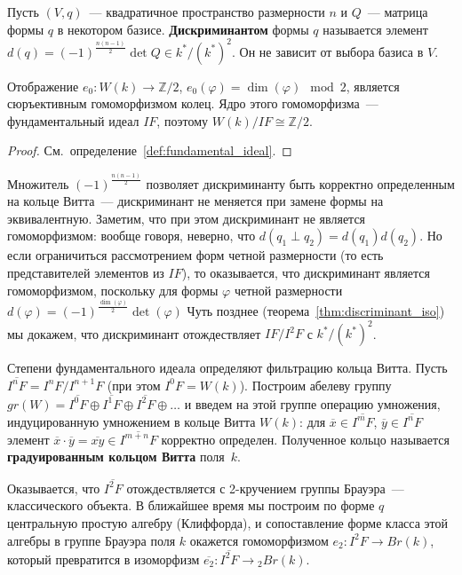 \documentclass[a4paper,oneside,12pt]{article}
\theoremstyle{plain} { \swapnumbers
\newtheorem{theorem}{Теорема}[subsection]
\newtheorem{corollary}[theorem]{Следствие}
\newtheorem{lemma}[theorem]{Лемма}
\newtheorem{proposition}[theorem]{Утверждение}
\newtheorem{claim}[theorem]{Факт}
}
\theoremstyle{definition} { \swapnumbers
\newtheorem{definition}[theorem]{Определение}
\newtheorem{notation}[theorem]{Обозначение}
\newtheorem{remark}[theorem]{Замечание}
\newtheorem{remarks}[theorem]{Замечания}
\newtheorem{example}[theorem]{Пример}
\newtheorem{examples}[theorem]{Примеры}
\newtheorem{sssection}[theorem]{}
}
\def\ph{\varphi}
\begin{document}
\begin{definition}
Пусть $(V,q)$~--- квадратичное пространство размерности $n$ и $Q$~--- матрица формы $q$ в некотором базисе.
{\bf Дискриминантом} формы $q$ называется элемент $d(q)=(-1)^{\frac{n(n-1)}{2}}\det Q\in k^*/(k^*)^2$.
Он не зависит от выбора базиса в $V$.
\end{definition}

\begin{proposition}
Отображение $e_0\colon W(k)\to\mathbb Z/2$, $e_0(\ph)=\dim(\ph)\mod 2$, является сюръективным
гомоморфизмом колец. Ядро этого гомоморфизма~--- фундаментальный идеал $IF$, поэтому
$W(k)/IF\cong\mathbb Z/2$.
\end{proposition}
\begin{proof}
См.~определение~\ref{def:fundamental_ideal}.
\end{proof}

Множитель $(-1)^{\frac{n(n-1)}{2}}$ позволяет дискриминанту быть корректно определенным на
кольце Витта~--- дискриминант не меняется при замене формы на эквивалентную.
Заметим, что при этом дискриминант не является гомоморфизмом: вообще говоря, неверно, что
$d(q_1\perp q_2)=d(q_1)d(q_2)$. Но если ограничиться рассмотрением форм четной размерности
(то есть представителей элементов из $IF$), то оказывается, что дискриминант является
гомоморфизмом,
поскольку для формы $\ph$ четной размерности $d(\ph)=(-1)^{\frac{\dim(\ph)}{2}}\det(\ph)$
Чуть позднее (теорема~\ref{thm:discriminant_iso})
мы докажем, что дискриминант отождествляет $IF/I^2F$ с $k^*/(k^*)^2$.

\begin{definition}
Степени фундаментального идеала определяют фильтрацию кольца Витта.
Пусть $\overline{I^nF}=I^nF/I^{n+1}F$ (при этом $I^0F=W(k)$). Построим
абелеву группу $gr(W)=\overline{I^0F}\oplus\overline{I^1F}\oplus\overline{I^2F}\oplus\dots$
и введем на этой группе операцию умножения, индуцированную умножением в кольце Витта $W(k)$:
для $\overline{x}\in\overline{I^mF}$, $\overline{y}\in\overline{I^nF}$ элемент
$\overline{x}\cdot\overline{y}=\overline{xy}\in\overline{I^{m+n}F}$ корректно определен.
Полученное кольцо называется {\bf градуированным кольцом Витта} поля~$k$.
\end{definition}

Оказывается, что $\overline{I^2F}$ отождествляется с 2-кручением группы
Брауэра~--- классического объекта. В ближайшее время мы построим по форме $q$ центральную простую алгебру
(Клиффорда), и сопоставление форме класса этой алгебры в группе Брауэра поля $k$
окажется гомоморфизмом $e_2\colon I^2F\to Br(k)$, который превратится в
изоморфизм $\overline{e_2}\colon \overline{I^2F}\to {}_2Br(k)$.
\end{document}
